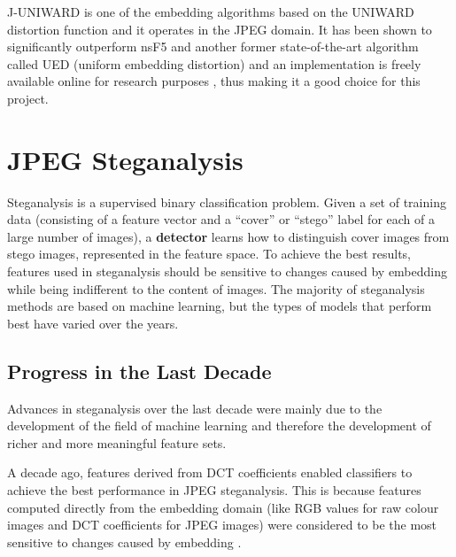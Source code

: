 \documentclass[11pt,a4paper,twoside,openright]{report}
\begin{document}
J-UNIWARD is one of the embedding algorithms based on the UNIWARD distortion function and it operates in the JPEG domain. It has been shown \cite{uniward-paper} to significantly outperform nsF5 and another former state-of-the-art algorithm called UED (uniform embedding distortion) and an implementation is freely available online for research purposes \cite{binghamton-embedding}, thus making it a good choice for this project.


\section{JPEG Steganalysis}

Steganalysis is a supervised binary classification problem. Given a set of training data (consisting of a feature vector and a ``cover'' or ``stego'' label for each of a large number of images), a \textbf{detector} learns how to distinguish cover images from stego images, represented in the feature space. To achieve the best results, features used in steganalysis should be sensitive to changes caused by embedding while being indifferent to the content of images. The majority of steganalysis methods are based on machine learning, but the types of models that perform best have varied over the years.


\subsection{Progress in the Last Decade} \label{sec:steganalysis-progress}

Advances in steganalysis over the last decade were mainly due to the development of the field of machine learning and therefore the development of richer and more meaningful feature sets.

A decade ago, features derived from DCT coefficients enabled classifiers to achieve the best performance in JPEG steganalysis. This is because features computed directly from the embedding domain (like RGB values for raw colour images and DCT coefficients for JPEG images) were considered to be the most sensitive to changes caused by embedding \cite{blind-steganalysis}.
\end{document}
